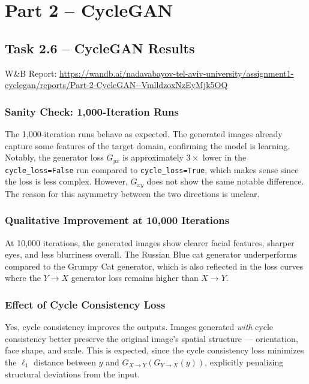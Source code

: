 \documentclass[11pt,a4paper]{article}
\begin{document}

\section*{Part 2 -- CycleGAN}

\subsection*{Task 2.6 -- CycleGAN Results}

W\&B Report: \url{https://wandb.ai/nadavabayov-tel-aviv-university/assignment1-cyclegan/reports/Part-2-CycleGAN--VmlldzoxNzEyMjk5OQ}

\subsubsection*{Sanity Check: 1,000-Iteration Runs}

The 1,000-iteration runs behave as expected. The generated images already capture some features of the target domain, confirming the model is learning. Notably, the generator loss $G_{yx}$ is approximately $3\times$ lower in the \texttt{cycle\_loss=False} run compared to \texttt{cycle\_loss=True}, which makes sense since the loss is less complex. However, $G_{xy}$ does not show the same notable difference. The reason for this asymmetry between the two directions is unclear.

\subsubsection*{Qualitative Improvement at 10,000 Iterations}

At 10,000 iterations, the generated images show clearer facial features, sharper eyes, and less blurriness overall. The Russian Blue cat generator underperforms compared to the Grumpy Cat generator, which is also reflected in the loss curves where the $Y \to X$ generator loss remains higher than $X \to Y$.

\subsubsection*{Effect of Cycle Consistency Loss}

Yes, cycle consistency improves the outputs. Images generated \emph{with} cycle consistency better preserve the original image's spatial structure --- orientation, face shape, and scale. This is expected, since the cycle consistency loss minimizes the $\ell_1$ distance between $y$ and $G_{X \to Y}(G_{Y \to X}(y))$, explicitly penalizing structural deviations from the input.
\end{document}
